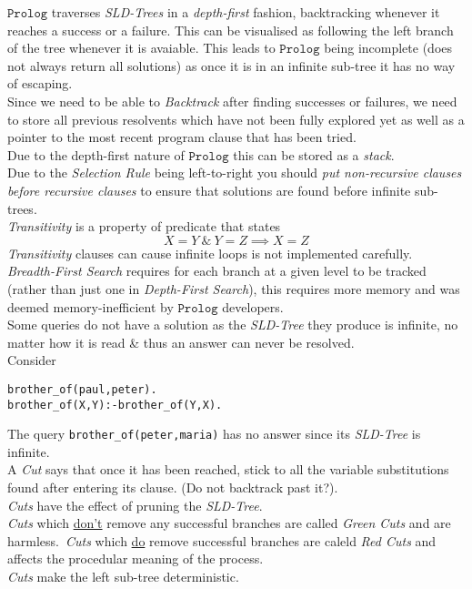 \documentclass[11pt,a4paper]{article}
\begin{document}
$\mathtt{Prolog}$ traverses \textit{SLD-Trees} in a \textit{depth-first} fashion, backtracking whenever it reaches a success or a failure. This can be visualised as following the left branch of the tree whenever it is avaiable. This leads to $\mathtt{Prolog}$ being incomplete (does not always return all solutions) as once it is in an infinite sub-tree it has no way of escaping.\\

Since we need to be able to \textit{Backtrack} after finding successes or failures, we need to store all previous resolvents which have not been fully explored yet as well as a pointer to the most recent program clause that has been tried.\\
Due to the depth-first nature of $\mathtt{Prolog}$ this can be stored as a \textit{stack}.\\

Due to the \textit{Selection Rule} being left-to-right you should \textit{put non-recursive clauses before recursive clauses} to ensure that solutions are found before infinite sub-trees.\\

\textit{Transitivity} is a property of predicate that states
$$X=Y\ \&\ Y=Z\implies X=Z$$
\textit{Transitivity} clauses can cause infinite loops is not implemented carefully.\\

\textit{Breadth-First Search} requires for each branch at a given level to be tracked (rather than just one in \textit{Depth-First Search}), this requires more memory and was deemed memory-inefficient by $\mathtt{Prolog}$ developers.\\

Some queries do not have a solution as the \textit{SLD-Tree} they produce is infinite, no matter how it is read \& thus an answer can never be resolved.\\
Consider
\begin{lstlisting}
brother_of(paul,peter).
brother_of(X,Y):-brother_of(Y,X).
\end{lstlisting}
The query \lstinline!brother_of(peter,maria)! has no answer since its \textit{SLD-Tree} is infinite.\\

A \textit{Cut} says that once it has been reached, stick to all the variable substitutions found after entering its clause. (\ie Do not backtrack past it?).\\
\textit{Cuts} have the effect of pruning the \textit{SLD-Tree}.\\
\textit{Cuts} which \underline{don't} remove any successful branches are called \textit{Green Cuts} and are harmless.\ \textit{Cuts} which \underline{do} remove successful branches are caleld \textit{Red Cuts} and affects the procedular meaning of the process.\\
\nb \textit{Cuts} make the left sub-tree deterministic.\\
\end{document}
